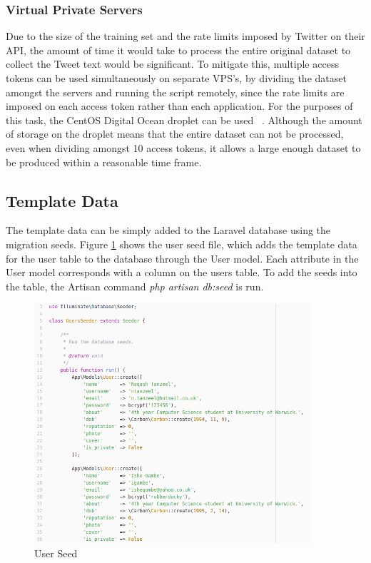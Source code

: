 \subsubsection{Virtual Private Servers}
Due to the size of the training set and the rate limits imposed by Twitter on their API, the amount of time it would take to process the entire original dataset to collect the Tweet text would be significant. To mitigate this, multiple access tokens can be used simultaneously on separate VPS's, by dividing the dataset amongst the servers and running the script remotely, since the rate limits are imposed on each access token rather than each application. For the purposes of this task, the CentOS Digital Ocean droplet can be used ~\cite{DigitalOcean:Home}. Although the amount of storage on the droplet means that the entire dataset can not be processed, even when dividing amongst 10 access tokens, it allows a large enough dataset to be produced within a reasonable time frame.

\subsection{Template Data}
The template data can be simply added to the Laravel database using the migration seeds. Figure \ref{fig:seed} shows the user seed file, which adds the template data for the user table to the database through the User model. Each attribute in the User model corresponds with a column on the users table. To add the seeds into the table, the Artisan command \textit{php artisan db:seed} is run.

\begin{figure}[H]
	\centering
	\includegraphics[height=3.5in]{Images/Implementation/seed}
	\caption{User Seed} \label{fig:seed}
\end{figure}

